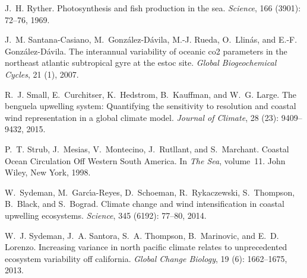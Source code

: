 \documentclass[hvmath, online,bgd]{copernicus_discussions}
\begin{document}
\begin{thebibliography}{84}
	J.~H. Ryther.
	\newblock Photosynthesis and fish production in the sea.
	\newblock \emph{Science}, 166 (3901): 72--76, 1969.
	
	J.~M. Santana-Casiano, M.~Gonz{\'a}lez-D{\'a}vila, M.-J. Rueda, O.~Llin{\'a}s,
	and E.-F. Gonz{\'a}lez-D{\'a}vila.
	\newblock The interannual variability of oceanic co2 parameters in the
	northeast atlantic subtropical gyre at the estoc site.
	\newblock \emph{Global Biogeochemical Cycles}, 21 (1), 2007.
	
	R.~J. Small, E.~Curchitser, K.~Hedstrom, B.~Kauffman, and W.~G. Large.
	\newblock The benguela upwelling system: Quantifying the sensitivity to
	resolution and coastal wind representation in a global climate model.
	\newblock \emph{Journal of Climate}, 28 (23): 9409--9432,
	2015.
	
	P.~T. Strub, J.~Mesias, V.~Montecino, J.~Rutllant, and S.~Marchant.
	\newblock Coastal {Ocean} {Circulation} {Off} {Western} {South} {America}.
	\newblock In \emph{The {Sea}}, volume~11. John Wiley, New York, 1998.
	
	W.~Sydeman, M.~Garc{\'\i}a-Reyes, D.~Schoeman, R.~Rykaczewski, S.~Thompson,
	B.~Black, and S.~Bograd.
	\newblock Climate change and wind intensification in coastal upwelling
	ecosystems.
	\newblock \emph{Science}, 345 (6192): 77--80, 2014.
	
	W.~J. Sydeman, J.~A. Santora, S.~A. Thompson, B.~Marinovic, and E.~D. Lorenzo.
	\newblock Increasing variance in north pacific climate relates to unprecedented
	ecosystem variability off california.
	\newblock \emph{Global Change Biology}, 19 (6): 1662--1675,
	2013.
	

\end{thebibliography}
\end{document}

